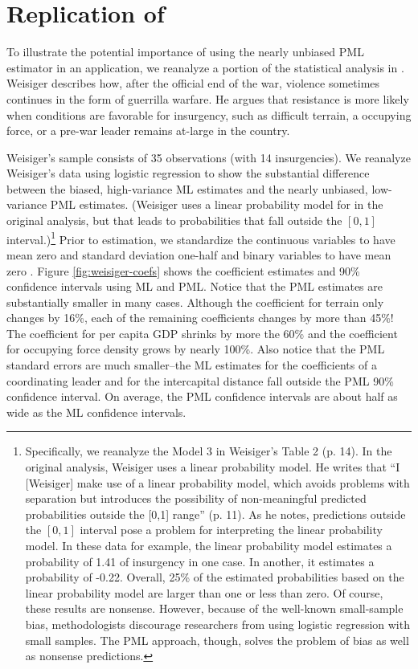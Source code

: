 \documentclass[12pt]{article}
\begin{document}
\section*{Replication of \cite{Weisiger2014}}

To illustrate the potential importance of using the nearly unbiased PML estimator in an application, we reanalyze a portion of the statistical analysis in \cite{Weisiger2014}. 
Weisiger describes how, after the official end of the war, violence sometimes continues in the form of guerrilla warfare. 
He argues that resistance is more likely when conditions are favorable for insurgency, such as difficult terrain, a occupying force, or a pre-war leader remains at-large in the country. 

Weisiger's sample consists of 35 observations (with 14 insurgencies). 
We reanalyze Weisiger's data using logistic regression to show the substantial difference between the biased, high-variance ML estimates and the nearly unbiased, low-variance PML estimates. 
(Weisiger uses a linear probability model for in the original analysis, but that leads to probabilities that fall outside the $[0, 1]$ interval.)\footnote{Specifically, we reanalyze the Model 3 in Weisiger's Table 2 (p. 14). 
In the original analysis, Weisiger uses a linear probability model. 
He writes that ``I [Weisiger] make use of a linear probability model, which avoids problems with separation but introduces the possibility of non-meaningful predicted probabilities outside the [0,1] range'' (p. 11).
As he notes, predictions outside the $[0, 1]$ interval pose a problem for interpreting the linear probability model. 
In these data for example, the linear probability model estimates a probability of 1.41 of insurgency in one case. 
In another, it estimates a probability of -0.22. 
Overall, 25\% of the estimated probabilities based on the linear probability model are larger than one or less than zero.
Of course, these results are nonsense. 
However, because of the well-known small-sample bias, methodologists discourage researchers from using logistic regression with small samples.
The PML approach, though, solves the problem of bias as well as nonsense predictions.} Prior to estimation, we standardize the continuous variables to have mean zero and standard deviation one-half and binary variables to have mean zero \citep{Gelman2008}.
Figure \ref{fig:weisiger-coefs} shows the coefficient estimates and 90\% confidence intervals using ML and PML. 
Notice that the PML estimates are substantially smaller in many cases.
Although the coefficient for terrain only changes by 16\%, each of the remaining coefficients changes by more than 45\%! 
The coefficient for per capita GDP shrinks by more the 60\% and the coefficient for occupying force density grows by nearly 100\%.
Also notice that the PML standard errors are much smaller--the ML estimates for the coefficients of a coordinating leader and for the intercapital distance fall outside the PML 90\% confidence interval.
On average, the PML confidence intervals are about half as wide as the ML confidence intervals.
\end{document}
